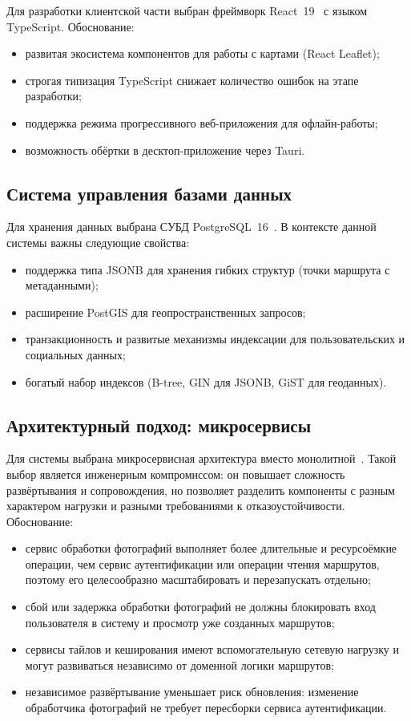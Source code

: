 Для разработки клиентской части выбран фреймворк React~19~\cite{banks2020} с языком TypeScript. Обоснование:
\begin{itemize}
  \item развитая экосистема компонентов для работы с картами (React Leaflet);
  \item строгая типизация TypeScript снижает количество ошибок на этапе разработки;
  \item поддержка режима прогрессивного веб-приложения для офлайн-работы;
  \item возможность обёртки в десктоп-приложение через Tauri.
\end{itemize}

\subsection{Система управления базами данных}

Для хранения данных выбрана СУБД PostgreSQL~16~\cite{silberschatz2019}. В
контексте данной системы важны следующие свойства:
\begin{itemize}
  \item поддержка типа JSONB для хранения гибких структур (точки маршрута с метаданными);
  \item расширение PostGIS для геопространственных запросов;
  \item транзакционность и развитые механизмы индексации для пользовательских и
    социальных данных;
  \item богатый набор индексов (B-tree, GIN для JSONB, GiST для геоданных).
\end{itemize}

\subsection{Архитектурный подход: микросервисы}

Для системы выбрана микросервисная архитектура вместо монолитной~\cite{newman2021,burns2018,tanenbaum2003}.
Такой выбор является инженерным компромиссом: он повышает сложность
развёртывания и сопровождения, но позволяет разделить компоненты с разным
характером нагрузки и разными требованиями к отказоустойчивости. Обоснование:
\begin{itemize}
  \item сервис обработки фотографий выполняет более длительные и ресурсоёмкие
    операции, чем сервис аутентификации или операции чтения маршрутов, поэтому
    его целесообразно масштабировать и перезапускать отдельно;
  \item сбой или задержка обработки фотографий не должны блокировать вход
    пользователя в систему и просмотр уже созданных маршрутов;
  \item сервисы тайлов и кеширования имеют вспомогательную сетевую нагрузку и
    могут развиваться независимо от доменной логики маршрутов;
  \item независимое развёртывание уменьшает риск обновления: изменение
    обработчика фотографий не требует пересборки сервиса аутентификации.
\end{itemize}

